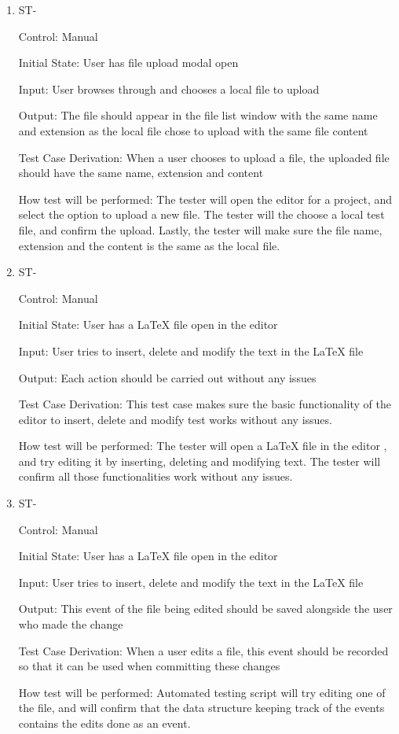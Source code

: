 \documentclass[12pt, titlepage]{article}
\newcounter{TESTID}
\newcommand\TESTNUM{\stepcounter{TESTID}\theTESTID}
\begin{document}
\begin{enumerate}
		\item{ST-\TESTNUM\\}
		
		Control: Manual
		
		Initial State: User has file upload modal open
		
		Input: User browses through and chooses a local file to upload
		
		Output:  The file should appear in the file list window with the same name and extension as the local file chose to upload with the same file content
		
		Test Case Derivation: When a user chooses to upload a file, the uploaded file should have the same name, extension and content
		
		How test will be performed: The tester will open the editor for a project, and select the option to upload a new file. The tester will the choose a local test file, and confirm the upload. Lastly, the tester will make sure the file name, extension and the content is the same as the local file.
		
		\item{ST-\TESTNUM\\}
		
		Control: Manual
		
		Initial State: User has a LaTeX file open in the editor
		
		Input: User tries to insert, delete and modify the text in the LaTeX file
		
		Output: Each action should be carried out without any issues
		
		Test Case Derivation: This test case makes sure the basic functionality of the editor to insert, delete and modify test works without any issues.
		
		How test will be performed: The tester will open a LaTeX file in the editor , and try editing it by inserting, deleting and modifying text. The tester will confirm all those functionalities work without any issues.
		
		\item{ST-\TESTNUM\\}
		
		Control: Manual
		
		Initial State: User has a LaTeX file open in the editor
		
		Input: User tries to insert, delete and modify the text in the LaTeX file
		
		Output: This event of the file being edited should be saved alongside the user who made the change
		
		Test Case Derivation: When a user edits a file, this event should be recorded so that it can be used when committing these changes
		
		How test will be performed: Automated testing script will try editing one of the file, and will confirm that the data structure keeping track of the events contains the edits done as an event.
		
		
		
	\end{enumerate}
	
\end{document}
